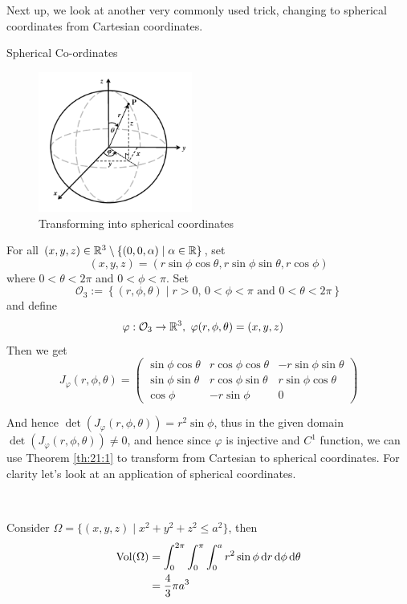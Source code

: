 \documentclass[../Analysis-3.tex]{subfiles}
\begin{document}
Next up, we look at another very commonly used trick, changing to spherical coordinates from Cartesian coordinates.

\begin{Eg}{Spherical Co-ordinates}{}
  \begin{figure}
    \centering
    \includegraphics[width=0.45\textwidth]{../figures/lec21.2.png}
    \caption{Transforming into spherical coordinates}
    \label{fig2:21}
  \end{figure}
  For all $(x,y,z) \in \mathbb{R}^3 \setminus \{ (0,0,\alpha) \mid \alpha \in \mathbb{R} \}$, set
  \[
    (x,y,z) = (r\sin\phi\cos\theta, r\sin\phi\sin\theta, r \cos\phi)
  \]
  where $0 < \theta < 2\pi$ and $0 < \phi < \pi$. Set
  \[
    \mathcal{O}_3 := \left\{ (r,\phi,\theta) \mid r >0, \, 0 < \phi < \pi \mbox{ and } 0 < \theta < 2\pi \right\}
  \]
  and define
  \begin{align*}
    \varphi : \mathcal{O}_3 & \to \mathbb{R}^3, \ \varphi(r,\phi,\theta) = (x,y,z)
  \end{align*}
  Then we get
  \[
    J_{\varphi}(r,\phi,\theta) = \begin{pmatrix}
      \sin\phi\cos\theta & r\cos\phi\cos\theta & -r\sin\phi\sin\theta \\
      \sin\phi\sin\theta & r\cos\phi\sin\theta & r\sin\phi\cos\theta  \\
      \cos\phi           & -r\sin\phi          & 0
    \end{pmatrix}
  \]


  And hence $\det(J_{\varphi}(r,\phi,\theta)) = r^2 \sin \phi$, thus in the given domain $\det(J_{\varphi}(r,\phi,\theta)) \neq 0$, and hence since $\varphi$ is injective and $C^1$ function, we can use Theorem \ref{th:21:1} to transform from Cartesian to spherical coordinates. For clarity let's look at an application of spherical coordinates.

  \

  Consider $\Omega = \{ (x,y,z) \mid x^2 + y^2 + z^2 \leq a^2 \}$, then
  \begin{align*}
    \operatorname{Vol}(\Omega)
     & = \int_0^{2\pi}\int_0^{\pi} \int_0^a r^2 \sin \phi \, \dd r \, \dd \phi \, \dd \theta \\
     & = \frac{4}{3}\pi a^3
  \end{align*}
\end{Eg}
\end{document}
